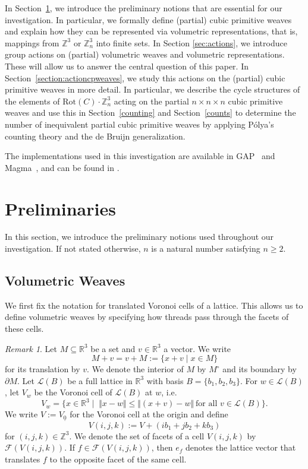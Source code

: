 \documentclass[12pt]{article}
\theoremstyle{definition}
\theoremstyle{remark}
\newtheorem{remark}[theorem]{Remark}
\begin{document}
In Section~\ref{sec:prelims}, we introduce the preliminary notions that are essential for our investigation. In particular, we formally define (partial) cubic primitive weaves and explain how they can be represented via volumetric representations, that is, mappings from $\mathbb{Z}^3$ or $\mathbb{Z}_n^3$ into finite sets. In Section \ref{sec:actions}, we introduce group actions on (partial) volumetric weaves and volumetric representations. These will allow us to answer the central question of this paper.
In Section~\ref{section:actioncpweaves}, we study this actions on the (partial) cubic primitive weaves in more detail. In particular, we describe the cycle structures of the elements of $\mathrm{Rot}(C)\cdot \mathbb{Z}_n^3$ acting on the partial $n\times n\times n$ cubic primitive weaves and use this in Section~\ref{counting} and Section~\ref{counts} to determine the number of inequivalent partial cubic primitive weaves by applying Pólya’s counting theory and the de Bruijn generalization.

The implementations used in this investigation are available in GAP~\cite{GAP4} and Magma~\cite{Bosma}, and can be found in \cite{yildiz_symmetry_decomposition}.










\section{Preliminaries}\label{sec:prelims}

In this section, we introduce the preliminary notions used throughout our investigation. If not stated otherwise, $n$ is a natural number satisfying $n\geq 2$.

\subsection{Volumetric Weaves}

We first fix the notation for translated Voronoi cells of a lattice. This allows us to define volumetric weaves by specifying how threads pass through the facets of these cells.

\begin{remark}
Let $M \subseteq \mathbb{R}^3$ be a set and $v \in \mathbb{R}^3$ a vector. We write
\[
M+v=v+M:=\{x+v\mid x\in M\}
\]
for its translation by $v$. We denote the interior of $M$ by $M^\circ$ and its boundary by $\partial M$.
Let $\mathcal{L}(B)$ be a full lattice in $\mathbb{R}^3$ with basis $B=\{b_1,b_2,b_3\}$. For $w\in\mathcal{L}(B)$, let $V_w$ be the Voronoi cell of $\mathcal{L}(B)$ at $w$, i.e.
\[
V_w = \{ x \in \mathbb{R}^3 \mid \; \Vert x-w\Vert  \le \Vert (x + v)-w\Vert  \ \text{for all } v \in \mathcal{L}(B) \}.
\]
We write $V:=V_{\underline{0}}$ for the Voronoi cell at the origin and define
\[
V(i,j,k):=V+(ib_1+jb_2+kb_3)
\]
for $(i,j,k)\in\mathbb Z^3$. We denote the set of facets of a cell $V(i,j,k)$ by $\mathcal F(V(i,j,k))$. If $f\in\mathcal F(V(i,j,k))$, then $e_f$ denotes the lattice vector that translates $f$ to the opposite facet of the same cell.
\end{remark}
\end{document}
